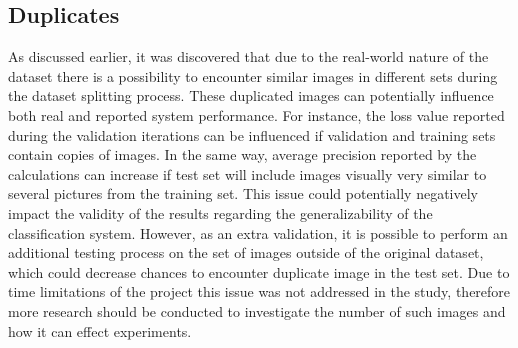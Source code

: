 \subsection{Duplicates}
As discussed earlier, it was discovered that due to the real-world nature of the dataset there is a possibility to encounter similar images in different sets during the dataset splitting process. These duplicated images can potentially influence both real and reported system performance. For instance, the loss value reported during the validation iterations can be influenced if validation and training sets contain copies of images. In the same way, average precision reported by the calculations can increase if test set will include images visually very similar to several pictures from the training set. This issue could potentially negatively impact the validity of the results regarding the generalizability of the classification system. However, as an extra validation, it is possible to perform an additional testing process on the set of images outside of the original dataset, which could decrease chances to encounter duplicate image in the test set. Due to time limitations of the project this issue was not addressed in the study, therefore more research should be conducted to investigate the number of such images and how it can effect experiments.

